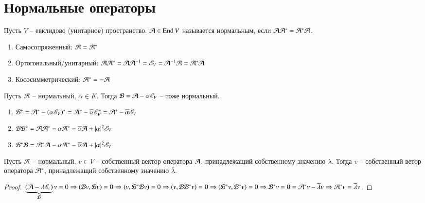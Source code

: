 \documentclass[main]{subfiles}
\begin{document}
\chapter{Нормальные операторы}

\begin{definition}
    Пусть $V$ -- евклидово (унитарное) пространство. $\mathcal{A} \in \operatorname{End} V$ называется нормальным, если
    $\mathcal{A} \mathcal{A}^* = \mathcal{A}^* \mathcal{A}$.
    \begin{enumerate}
        \item Самосопряженный: $\mathcal{A} = \mathcal{A}^*$
        \item Ортогональный/унитарный: $\mathcal{A} \mathcal{A}^* = \mathcal{A} \mathcal{A}^{-1} =\mathscr{E}_V = \mathcal{A}^{-1} \mathcal{A} = \mathcal{A}^* \mathcal{A}$
        \item Кососимметрический: $\mathcal{A}^* = -\mathcal{A}$
    \end{enumerate}
\end{definition}

\begin{proposition}
    Пусть $\mathcal{A}$ -- нормальный, $\alpha \in K$. Тогда $\mathcal{B} = \mathcal{A} - \alpha \mathscr{E}_V$ -- тоже нормальный.
    \begin{enumerate}
        \item $\mathcal{B}^* = \mathcal{A}^* - (\alpha \mathscr{E}_V)^* = \mathcal{A}^* - \overline{\alpha}\mathscr{E}_V^* = \mathcal{A}^* - \overline{\alpha}\mathscr{E}_V$
        \item $\mathcal{B} \mathcal{B}^* = \mathcal{A} \mathcal{A}^* - \alpha\mathcal{A}^* - \overline{\alpha}\mathcal{A} + |\alpha|^2\mathscr{E}_V$
        \item $\mathcal{B}^* \mathcal{B} = \mathcal{A}^* \mathcal{A} - \alpha \mathcal{A}^* - \overline{\alpha}\mathcal{A} + |\alpha|^2\mathscr{E}_V$
    \end{enumerate}
\end{proposition}

\begin{proposition}
    Пусть $\mathcal{A}$ -- нормальный, $v \in V$ -- собственный вектор оператора $\mathcal{A}$, принадлежащий собственному значению $\lambda$. Тогда $v$ -- собственный ветор оператора $\mathcal{A}^*$, принадлежащий собственному значению $\overline{\lambda}$.
\end{proposition}

\begin{proof}
    $\underbrace{(\mathcal{A} - \lambda \mathscr{E}_v)}_{\mathcal{B}} v = 0 \Rightarrow (\mathcal{B} v, \mathcal{B} v) = 0 \Rightarrow
        (v, \mathcal{B}^* \mathcal{B} v) = 0 \Rightarrow (v, \mathcal{B} \mathcal{B}^* v) = 0 \Rightarrow (\mathcal{B}^* v, \mathcal{B}^* v) = 0 \Rightarrow \mathcal{B}^*v = 0 = \mathcal{A}^* v - \overline{\lambda}v \Rightarrow \mathcal{A}^*v = \overline{\lambda}v$.
\end{proof}
\end{document}
